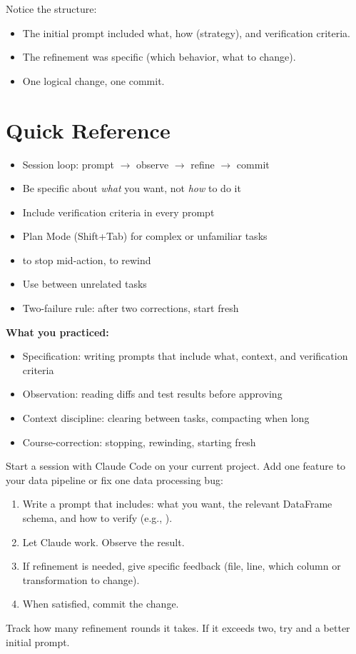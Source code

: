 Notice the structure:
\begin{itemize}
  \item The initial prompt included what, how (strategy), and verification criteria.
  \item The refinement was specific (which behavior, what to change).
  \item One logical change, one commit.
\end{itemize}

\section{Quick Reference}

\begin{itemize}
  \item Session loop: prompt $\rightarrow$ observe $\rightarrow$ refine $\rightarrow$ commit
  \item Be specific about \emph{what} you want, not \emph{how} to do it
  \item Include verification criteria in every prompt
  \item Plan Mode (Shift+Tab) for complex or unfamiliar tasks
  \item {} to stop mid-action,  to rewind
  \item Use  between unrelated tasks
  \item Two-failure rule: after two corrections, start fresh
\end{itemize}

\textbf{What you practiced:}
\begin{itemize}
  \item Specification: writing prompts that include what, context, and verification criteria
  \item Observation: reading diffs and test results before approving
  \item Context discipline: clearing between tasks, compacting when long
  \item Course-correction: stopping, rewinding, starting fresh
\end{itemize}

\begin{trybox}
Start a session with Claude Code on your current project.
Add one feature to your data pipeline or fix one data processing bug:
\begin{enumerate}
  \item Write a prompt that includes: what you want, the relevant
    DataFrame schema, and how to verify (e.g., ).
  \item Let Claude work. Observe the result.
  \item If refinement is needed, give specific feedback
    (file, line, which column or transformation to change).
  \item When satisfied, commit the change.
\end{enumerate}
Track how many refinement rounds it takes.
If it exceeds two, try  and a better initial prompt.
\end{trybox}
